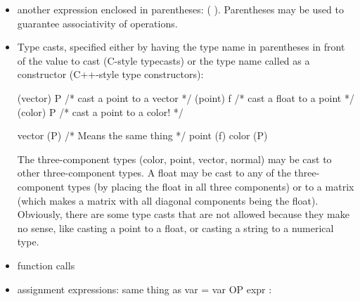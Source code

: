\documentclass[11pt,letterpaper]{book}
\def\color{{\cf color}\xspace}
\def\float{{\cf float}\xspace}
\def\inttype{{\cf int}\xspace}
\def\normal{{\cf normal}\xspace}
\def\point{{\cf point}\xspace}
\def\vector{{\cf vector}\xspace}
\begin{document}
\begin{itemize}
\hspace{0.5in}  \emph{expr1} {\cf \&\&} \emph{expr2}

\hspace{0.5in}    \emph{expr1} {\cf ||} \emph{expr2}

\noindent Note that the {\cf not}, {\cf and}, and {\cf or} keywords are
synonyms for {\cf !}, {\cf \&\&}, and {\cf ||}, respectively.

For the logical operators, numeric expressions (\inttype or \float) are
considered \emph{true} if nonzero, \emph{false} if zero.
Multi-component types (such as \color) are considered \emph{true} any
component is nonzero, \emph{false} all components are zero.  Strings are
considered \emph{true} if they are nonempty, \emph{false} if they are
the empty string (\qkw{}).

\item another expression enclosed in parentheses: {\cf ( )}.
  Parentheses may be used to guarantee associativity of operations.

\item Type casts, specified either by having the type name in 
parentheses in front of the value to cast (C-style typecasts)
or the type name called as a constructor (C++-style type constructors):
\begin{code}
        (vector) P            /* cast a point to a vector */
        (point) f             /* cast a float to a point */
        (color) P             /* cast a point to a color! */

        vector (P)            /* Means the same thing */
        point (f)
        color (P)
\end{code}

The three-component types (\color, \point, \vector, \normal)
may be cast to other three-component types.  A \float
may be cast to any of the three-component types (by placing the
float in all three components) or to a {\cf matrix} (which makes a
matrix with all diagonal components being the {\cf float}).
Obviously, there are some type casts that are not allowed because
they make no sense, like casting a {\cf point} to a {\cf float}, or
casting a {\cf string} to a numerical type.

\item function calls

\item assignment expressions:
same thing as {\cf var = var OP expr} :


\end{itemize}
\end{document}
